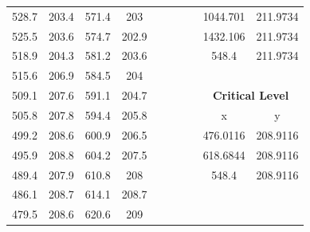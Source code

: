 \begin{center}
\begin{tabular}{|cccc||cccc||cc|}
    528.7    & 203.4                   & 571.4 & 203                          &          &                        &       &                              & 1044.701 & 211.9734                           \\
    525.5    & 203.6                   & 574.7 & 202.9                        &          &                        &       &                              & 1432.106 & 211.9734                           \\
    518.9    & 204.3                   & 581.2 & 203.6                        &          &                        &       &                              & 548.4    & 211.9734                           \\
    515.6    & 206.9                   & 584.5 & 204                          &          &                        &       &                              &          &                                    \\
    509.1    & 207.6                   & 591.1 & 204.7                        &          &                        &       &                              & \multicolumn{2}{c|}{\textbf{Critical Level}}  \\ 
    \cline{9-10}
    505.8    & 207.8                   & 594.4 & 205.8                        &          &                        &       &                              & x        & y                                  \\
    499.2    & 208.6                   & 600.9 & 206.5                        &          &                        &       &                              & 476.0116 & 208.9116                           \\
    495.9    & 208.8                   & 604.2 & 207.5                        &          &                        &       &                              & 618.6844 & 208.9116                           \\
    489.4    & 207.9                   & 610.8 & 208                          &          &                        &       &                              & 548.4    & 208.9116                           \\
    486.1    & 208.7                   & 614.1 & 208.7                        &          &                        &       &                              &          &                                    \\
    479.5    & 208.6                   & 620.6 & 209                          &          &                        &       &                              &          &                                    \\

\end{tabular}
\end{center}
